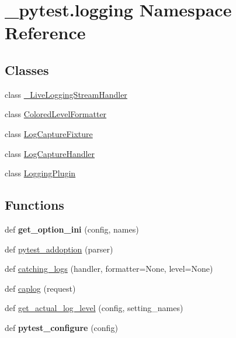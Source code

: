 \hypertarget{namespace__pytest_1_1logging}{}\section{\+\_\+pytest.\+logging Namespace Reference}
\label{namespace__pytest_1_1logging}
\subsection*{Classes}
\begin{DoxyCompactItemize}
\item 
class \hyperlink{class__pytest_1_1logging_1_1___live_logging_stream_handler}{\+\_\+\+Live\+Logging\+Stream\+Handler}
\item 
class \hyperlink{class__pytest_1_1logging_1_1_colored_level_formatter}{Colored\+Level\+Formatter}
\item 
class \hyperlink{class__pytest_1_1logging_1_1_log_capture_fixture}{Log\+Capture\+Fixture}
\item 
class \hyperlink{class__pytest_1_1logging_1_1_log_capture_handler}{Log\+Capture\+Handler}
\item 
class \hyperlink{class__pytest_1_1logging_1_1_logging_plugin}{Logging\+Plugin}
\end{DoxyCompactItemize}
\subsection*{Functions}
\begin{DoxyCompactItemize}
\item 
\mbox{\label{namespace__pytest_1_1logging_a7f41502188bd4699578cc927ecfdd2bf}} 
def {\bfseries get\+\_\+option\+\_\+ini} (config, names)
\item 
def \hyperlink{namespace__pytest_1_1logging_a7d11ed285b6542e63c42b1f27b49cefa}{pytest\+\_\+addoption} (parser)
\item 
def \hyperlink{namespace__pytest_1_1logging_af77c0229b1968dd8184ddb02082c9196}{catching\+\_\+logs} (handler, formatter=None, level=None)
\item 
def \hyperlink{namespace__pytest_1_1logging_ac711b2668a331a9ba457cb6ad56bda10}{caplog} (request)
\item 
def \hyperlink{namespace__pytest_1_1logging_a62922e3596d372c67b2278069d76b38c}{get\+\_\+actual\+\_\+log\+\_\+level} (config, setting\+\_\+names)
\item 
\mbox{\label{namespace__pytest_1_1logging_a671480ea5d1e4e78519d1f3086beb20f}} 
def {\bfseries pytest\+\_\+configure} (config)
\end{DoxyCompactItemize}
